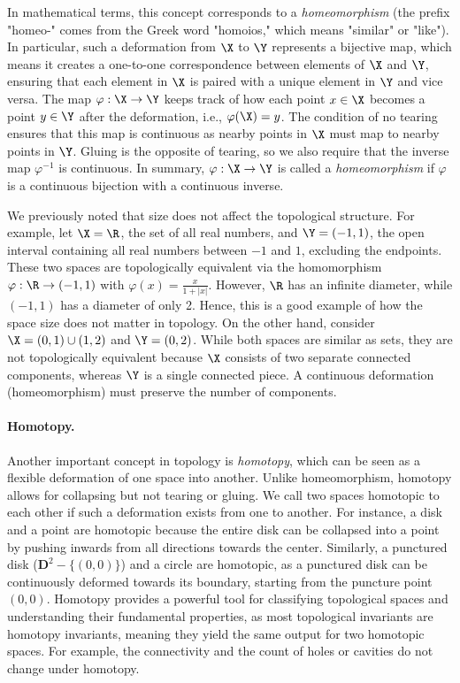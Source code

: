 In mathematical terms, this concept corresponds to a \textit{homeomorphism} (the prefix "homeo-" comes from the Greek word "homoios," which means "similar" or "like"). In particular, such a deformation from $\X$ to $\Y$ represents a bijective map, which means it creates a one-to-one correspondence between elements of $\X$ and $\Y$, ensuring that each element in $\X$ is paired with a unique element in $\Y$ and vice versa. The map $\varphi:\X \to\Y$ keeps track of how each point $x \in\X$ becomes a point $y \in\Y$ after the deformation, i.e., $\varphi(\X) = y$. The condition of no tearing ensures that this map is continuous as nearby points in $\X$ must map to nearby points in $\Y$. Gluing is the opposite of tearing, so we also require that the inverse map $\varphi^{-1}$ is continuous. In summary, $\varphi:\X \to\Y$ is called a \textit{homeomorphism} if $\varphi$ is a continuous bijection with a continuous inverse.

We previously noted that size does not affect the topological structure. For example, let $\X = \R$, the set of all real numbers, and $\Y = (-1, 1)$, the open interval containing all real numbers between $-1$ and $1$, excluding the endpoints. These two spaces are topologically equivalent via the homomorphism $\varphi:\R\to(-1,1)$ with  $\varphi(x) = \frac{x}{1 + |x|}$. However, $\R$ has an infinite diameter, while $(-1,1)$ has a diameter of only 2. Hence, this is a good example of how the space size does not matter in topology. On the other hand, consider $\X = (0,1) \cup (1,2)$ and $\Y = (0,2)$. While both spaces are similar as sets, they are not topologically equivalent because $\X$ consists of two separate connected components, whereas $\Y$ is a single connected piece. A continuous deformation (homeomorphism) must preserve the number of components.

 
\paragraph*{Homotopy.} Another important concept in topology is {\em homotopy}, which can be seen as a flexible deformation of one space into another. Unlike homeomorphism, homotopy allows for collapsing but not tearing or gluing. We call two spaces homotopic to each other if such a deformation exists from one to another. For instance, a disk and a point are homotopic because the entire disk can be collapsed into a point by pushing inwards from all directions towards the center. Similarly, a punctured disk ($\mathbf{D}^2-\{(0,0)\}$) and a circle are homotopic, as a punctured disk can be continuously deformed towards its boundary, starting from the puncture point $(0,0)$. Homotopy provides a powerful tool for classifying topological spaces and understanding their fundamental properties, as most topological invariants are homotopy invariants, meaning they yield the same output for two homotopic spaces. For example, the connectivity and the count of holes or cavities do not change under homotopy.



